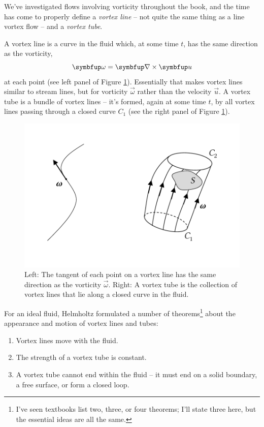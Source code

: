 We've investigated flows involving vorticity throughout the book, and the time has come to properly define a \emph{vortex line} -- not quite the same thing as a line vortex flow -- and a \emph{vortex tube}.  

A vortex line is a curve in the fluid which, at some time $t$, has the same direction as the vorticity,
\[
\vec{\omega} = \grad \times \vec{u}
\]
at each point (see left panel of Figure \ref{fig_vortex_tube}).  Essentially that makes vortex lines similar to stream lines, but for vorticity $\vec{\omega}$ rather than the velocity $\vec{u}$.  A vortex tube is a bundle of vortex lines -- it's formed, again at some time $t$, by all vortex lines passing through a closed curve $C_1$ (see the right panel of Figure \ref{fig_vortex_tube}).  

\begin{figure}
\centering\includegraphics[width=0.8\linewidth]{Figures/Chapter4/fig_vortex_tube}
\caption{Left: The tangent of each point on a vortex line has the same direction as the vorticity $\vec{\omega}$.  Right: A vortex tube is the collection of vortex lines that lie along a closed curve in the fluid.}
\label{fig_vortex_tube}
\end{figure}

For an ideal fluid, Helmholtz formulated a number of theorems\footnote{I've seen textbooks list two, three, or four theorems; I'll state three here, but the essential ideas are all the same.} about the appearance and motion of vortex lines and tubes:

\begin{theorem}
\begin{enumerate}
\item Vortex lines move with the fluid.
\item The strength of a vortex tube is constant.
\item A vortex tube cannot end within the fluid -- it must end on a solid boundary, a free surface, or form a closed loop.
\end{enumerate}
\end{theorem}

